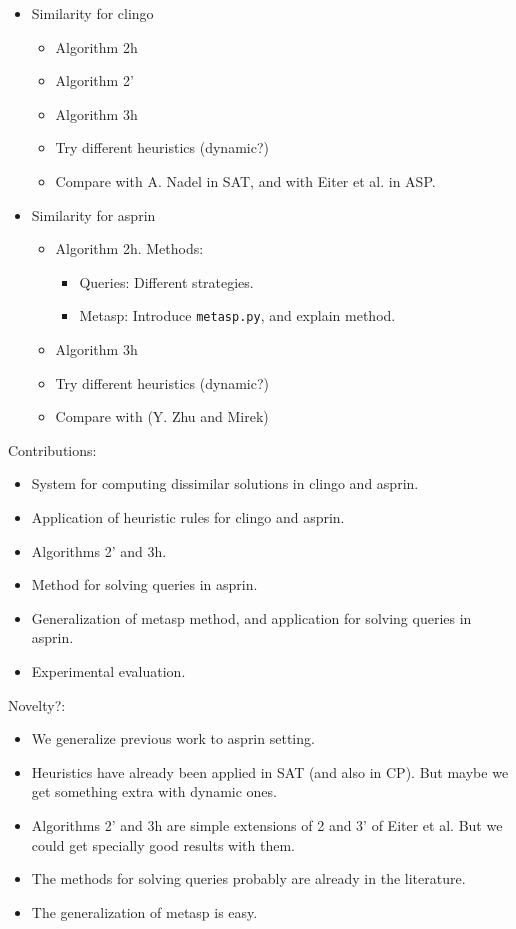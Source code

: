 \documentclass[a4paper,10pt]{article}
\begin{document}
\begin{itemize}
\item
Similarity for clingo
\begin{itemize}
    \item
    Algorithm 2h
    \item
    Algorithm 2'
    \item
    Algorithm 3h
    \item
    Try different heuristics (dynamic?)
    \item
    Compare with A. Nadel in SAT, and with Eiter et al. in ASP.
\end{itemize}
\item
Similarity for asprin
\begin{itemize}
    \item
    Algorithm 2h. Methods:
    \begin{itemize}
        \item
        Queries: Different strategies.
        \item
        Metasp: Introduce \verb|metasp.py|, and explain method.
    \end{itemize}
    \item
    Algorithm 3h
    \item
    Try different heuristics (dynamic?)
    \item
    Compare with (Y. Zhu and Mirek)
\end{itemize}
\end{itemize}

Contributions:
\begin{itemize}
\item
System for computing dissimilar solutions in clingo and asprin.
\item
Application of heuristic rules for clingo and asprin.
\item
Algorithms 2' and 3h.
\item
Method for solving queries in asprin.
\item
Generalization of metasp method, and application for solving queries in asprin.
\item
Experimental evaluation.
\end{itemize}

Novelty?:
\begin{itemize}
\item
We generalize previous work to asprin setting.
\item
Heuristics have already been applied in SAT (and also in CP).
But maybe we get something extra with dynamic ones.
\item
Algorithms 2' and 3h are simple extensions of 2 and 3' of Eiter et al.
But we could get specially good results with them.
\item
The methods for solving queries probably are already in the literature.
\item
The generalization of metasp is easy.
\end{itemize}
\end{document}
